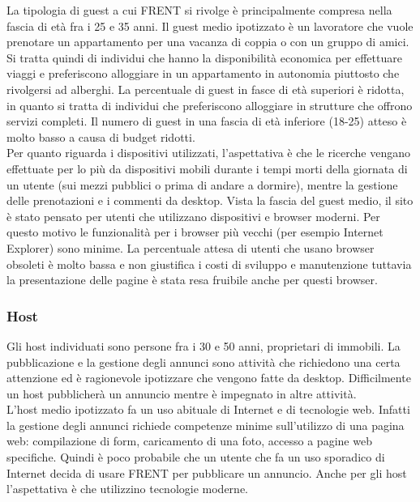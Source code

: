 \documentclass[1_relazione.tex]{subfiles}
\begin{document}
La tipologia di guest a cui FRENT si rivolge \`{e} principalmente compresa nella fascia di et\`{a} fra i 25 e 35 anni. Il guest medio ipotizzato \`{e} un lavoratore che vuole prenotare un appartamento per una vacanza di coppia o con un gruppo di amici. Si tratta quindi di individui che hanno la disponibilit\`{a} economica per effettuare viaggi e preferiscono alloggiare in un appartamento in autonomia piuttosto che rivolgersi ad alberghi. La percentuale di guest in fasce di et\`{a} superiori \`{e} ridotta, in quanto si tratta di individui che preferiscono alloggiare in strutture che offrono servizi completi.  Il numero di guest in una fascia di et\`{a} inferiore (18-25) atteso \`{e} molto basso a causa di budget ridotti.   \\
Per quanto riguarda i dispositivi utilizzati, l'aspettativa \`{e} che le ricerche vengano effettuate per lo pi\`{u} da dispositivi mobili durante i tempi morti della giornata di un utente (sui mezzi pubblici o prima di andare a dormire), mentre la gestione delle prenotazioni e i commenti da desktop.
Vista la fascia del guest medio, il sito \`{e} stato pensato per utenti che utilizzano dispositivi e browser moderni.
Per questo motivo le funzionalit\`{a} per i browser pi\`{u} vecchi (per esempio Internet Explorer) sono minime. La percentuale attesa di utenti che usano browser obsoleti \`{e} molto bassa e non giustifica i costi di sviluppo e manutenzione tuttavia la presentazione delle pagine \`{e} stata resa fruibile anche per questi browser.

\subsubsection{Host}
Gli host individuati sono persone fra i 30 e 50 anni, proprietari di immobili. La pubblicazione e la gestione degli annunci sono attivit\`{a} che richiedono una certa attenzione ed \`{e} ragionevole ipotizzare che vengono fatte da desktop. Difficilmente un host pubblicher\`{a} un annuncio mentre \`{e} impegnato in altre attivit\`{a}. \\
L'host medio ipotizzato fa un uso abituale di Internet e di tecnologie web. Infatti la gestione degli annunci richiede competenze minime sull'utilizzo di una pagina web: compilazione di form, caricamento di una foto, accesso a pagine web specifiche. Quindi \`{e} poco probabile che un utente che fa un uso sporadico di Internet decida di usare FRENT per pubblicare un annuncio.
Anche per gli host l'aspettativa \`{e} che utilizzino tecnologie moderne.
\end{document}
